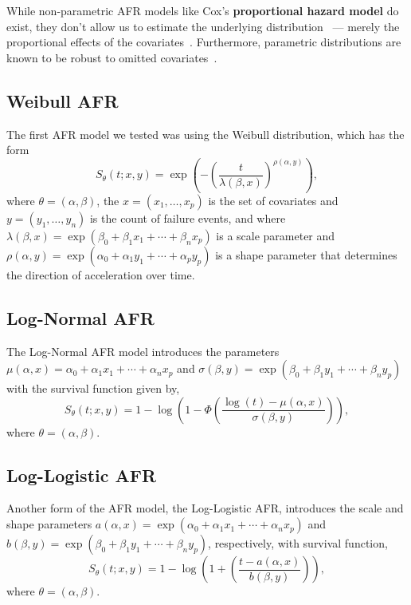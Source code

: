 While non-parametric AFR models like Cox's \textbf{proportional hazard model} do exist, they don't allow us to estimate the underlying distribution~\cite{kleinbaum1996survival} --- merely the proportional effects of the covariates~\citep{aft_models}. Furthermore, parametric distributions are known to be robust to omitted covariates~\citep{lambert2004parametric}.

\subsection{Weibull AFR}
The first AFR model we tested was using the Weibull distribution, which has the form
\[
    S_\theta(t; x, y) = \exp{\left( - \left( \frac{t}{\lambda(\beta, x)} \right)^{\rho(\alpha, y)} \right)},
\]
where $\theta=(\alpha, \beta)$, the $x = (x_1, \ldots, x_p)$ is the set of covariates and $y=(y_1, \ldots, y_n)$ is the count of failure events, and where $\lambda(\beta, x)=\exp(\beta_0 + \beta_1 x_1 + \cdots + \beta_n x_p)$ is a scale parameter and $\rho(\alpha, y)=\exp(\alpha_0 + \alpha_1 y_1 + \cdots + \alpha_p y_p)$ is a shape parameter that determines the direction of acceleration over time.

\subsection{Log-Normal AFR}

The Log-Normal AFR model introduces the parameters $\mu(\alpha, x) = \alpha_0 + \alpha_1 x_1 + \cdots + \alpha_n x_p $ and $\sigma(\beta, y) = \exp(\beta_0 + \beta_1 y_1 + \cdots + \beta_n y_p)$ with the survival function given by,
\[
    S_\theta(t; x, y) = 1 - \log \left( 1 - \Phi \left (  \frac{\log(t) - \mu(\alpha, x) }{ \sigma(\beta, y) } \right) \right),
\]
where $\theta = (\alpha, \beta)$.



\subsection{Log-Logistic AFR}

Another form of the AFR model, the Log-Logistic AFR, introduces the scale and shape parameters $a(\alpha, x) = \exp(\alpha_0 + \alpha_1 x_1 + \cdots + \alpha_n x_p )$ and $b(\beta, y) = \exp(\beta_0 + \beta_1 y_1 + \cdots + \beta_n y_p)$, respectively, with survival function,
\[
    S_\theta(t; x, y) = 1 - \log \left( 1 + \left (  \frac{t - a(\alpha, x) }{ b(\beta, y) }\right)\right),
\]
where $\theta = (\alpha, \beta)$.



